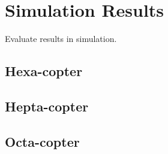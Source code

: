 \chapter{Simulation Results}
\label{sec:simulation_results}
Evaluate results in simulation.

\section{Hexa-copter}
\label{sec:hexa_copter}

\section{Hepta-copter}
\label{sec:hepta_copter}

\section{Octa-copter}
\label{sec:octa_copter}
